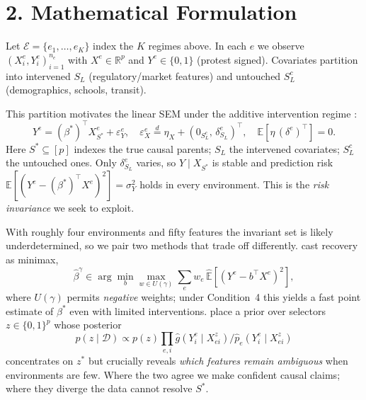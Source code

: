 \documentclass[11pt]{article}
\begin{document}
\section*{2. Mathematical Formulation}

Let $\mathcal{E}=\{e_1,\ldots,e_K\}$ index the $K$ regimes above. In each $e$ we observe $(X^e_i, Y^e_i)_{i=1}^{n_e}$ with $X^e\in\mathbb{R}^p$ and $Y^e\in\{0,1\}$ (protest signed). Covariates partition into intervened $S_L$ (regulatory/market features) and untouched $S_L^c$ (demographics, schools, transit).

This partition motivates the linear SEM \citep[Ch.~4]{peters2017elements} under the additive intervention regime \citep{rothenhausler2019causal}:
\[
    Y^e = (\beta^*)^\top X^e_{S^*} + \varepsilon^e_Y, \quad \varepsilon^e_X \stackrel{d}{=} \eta_X + (0_{S_L^c},\, \delta^e_{S_L})^\top, \quad \mathbb{E}[\eta\,(\delta^e)^\top]=0.
\]
Here $S^*\!\subseteq[p]$ indexes the true causal parents; $S_L$ the intervened covariates; $S_L^c$ the untouched ones. Only $\delta^e_{S_L}$ varies, so $Y\mid X_{S^*}$ is stable and prediction risk $\mathbb{E}[(Y^e - (\beta^*)^\top X^e)^2]=\sigma^2_Y$ holds in every environment. This is the \emph{risk invariance} we seek to exploit.

With roughly four environments and fifty features the invariant set is likely underdetermined, so we pair two methods that trade off differently. \citet{fan2024negdro} cast recovery as minimax,
\[
  \hat\beta^{\gamma}\in\arg\min_{b}\max_{w\in U(\gamma)}\textstyle\sum_{e} w_e\,\hat{\mathbb{E}}[(Y^e{-}b^\top X^e)^2],
\]
where $U(\gamma)$ permits \emph{negative} weights; under Condition~4 this yields a fast point estimate of $\beta^*$ even with limited interventions. \citet{wu2025bayesian} place a prior over selectors $z\in\{0,1\}^p$ whose posterior
\[
  p(z\mid\mathcal{D})\propto p(z)\prod_{e,i}\hat g(Y^e_i\mid X^z_{ei})\big/\hat p_e(Y^e_i\mid X^z_{ei})
\]
concentrates on $z^*$ but crucially reveals \emph{which features remain ambiguous} when environments are few. Where the two agree we make confident causal claims; where they diverge the data cannot resolve $S^*$.

\vspace{-0.5em}
{\scriptsize\setlength{\bibsep}{0pt}


}
\end{document}

